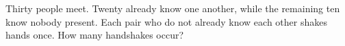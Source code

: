 Thirty people meet. Twenty already know one another, while the remaining ten know nobody present. Each pair who do not already know each other shakes hands once. How many handshakes occur?
